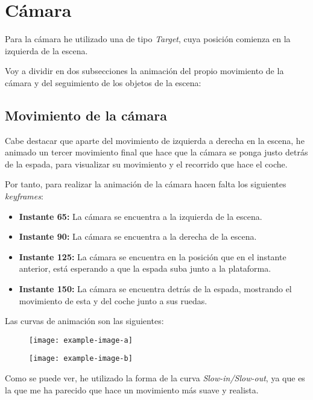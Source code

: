 \section{Cámara}

Para la cámara he utilizado una de tipo \textit{Target}, cuya posición comienza en la izquierda de la escena.

Voy a dividir en dos subsecciones la animación del propio movimiento de la cámara y del seguimiento de los objetos de la escena:

\subsection{Movimiento de la cámara}

Cabe destacar que aparte del movimiento de izquierda a derecha en la escena, he animado un tercer movimiento final que hace que la cámara se ponga justo detrás de la espada, para visualizar su movimiento y el recorrido que hace el coche.

\bigskip

Por tanto, para realizar la animación de la cámara hacen falta los siguientes \textit{keyframes}:

\begin{itemize}
    \item \textbf{Instante 65: }La cámara se encuentra a la izquierda de la escena.
    \item \textbf{Instante 90: }La cámara se encuentra a la derecha de la escena.
    \item \textbf{Instante 125: }La cámara se encuentra en la posición que en el instante anterior, está esperando a que la espada suba junto a la plataforma.
    \item \textbf{Instante 150: }La cámara se encuentra detrás de la espada, mostrando el movimiento de esta y del coche junto a sus ruedas.
\end{itemize}

\bigskip

Las curvas de animación son las siguientes: 

\begin{figure}[H]
    \centering
   \texttt{[image: example-image-a]}
\end{figure}
\begin{figure}[H]
    \centering
   \texttt{[image: example-image-b]}
\end{figure}

Como se puede ver, he utilizado la forma de la curva \textit{Slow-in/Slow-out}, ya que es la que me ha parecido que hace un movimiento más suave y realista.

